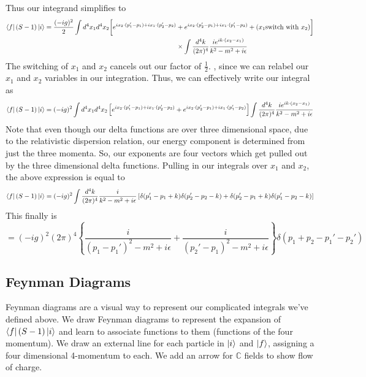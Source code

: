 \documentclass[11pt, oneside]{article}   	%
\theoremstyle{newline}
\theoremstyle{newline}
\theoremstyle{newline}
\theoremstyle{newline}
\theoremstyle{newline}
\begin{document}
Thus our integrand simplifies to
\begin{align*}
\bra { f } ( S- 1 ) \ket { i } = \frac{ ( - i g ) ^ 2 }{ 2 } \int d^ 4 x_1 d^ 4 x_2 \bigg [ e^{ i x_2 \cdot  ( p_1' - p_1 )  + i x_1 \cdot  ( p_2 ' - p_2 ) } & + 
e^{ i x_2 \cdot  ( p_2' - p_1 ) + i x_1 \cdot  ( p_1' - p_2 ) } + ( x_1 \text{switch with } x_2 ) \bigg ] \\
& \times \int \frac{ d^ 4 k }{ ( 2 \pi ) ^ 4 } \frac{ i e^{ ik \cdot  ( x_2 - x_1 ) }}{k ^ 2 - m ^ 2 + i \epsilon } 
\end{align*}
The switching of $ x_1 $ and $ x_2 $ cancels out 
our factor of $ \frac{1}{2 } $. , since we can 
relabel our $ x_1 $ and $ x_2 $ variables in our 
integration. Thus, we can effectively write our integral as 
\[
\bra{ f} ( S - 1) \ket{ i }  = ( - i g ) ^ 2 \int d ^ 4 x_1 d^ 4 x_2 \left[  e^{ i x_2 \cdot  ( p_1 ' - p_1 ) + i x_1 \cdot  ( p_2 ' - p_2 ) } + e^{ i x_2 \cdot  ( p_2 ' - p_1 ) + i x_1 \cdot  ( p_1 ' - p_2 ) } \right] \int \frac{ d^ 4 k }{ ( 2 \pi ) ^ 4 } \frac{ i e ^{ i k \cdot  ( x_2 - x_1 ) } }{ k ^ 2 - m ^ 2 + i \epsilon } 
\] Note that even though our delta functions 
are over three dimensional space, due to 
the relativistic dispersion relation, our energy component
is determined from just the three momenta. So, our exponents are four vectors
which get pulled out by the three dimensional delta functions. 
Pulling in our integrals over $ x_1 $ and $ x_2 $, 
the above expression is equal to 
\[
\bra { f } ( S- 1 ) \ket { i }  = ( - i g ) ^ 2 \int \frac{ d^ 4 k }{ ( 2 \pi ) ^ 4 } \frac{ i }{ k ^ 2 - m ^ 2 + i \epsilon   } \left[  \delta ( p_1 '  - p_1 + k ) \delta ( p_2 ' - p_2 - k )  + \delta ( p_2' - p_1 + k ) \delta ( p_1' - p_2 - k )  \right]  
\] This finally is 
\[
= ( - i g ) ^ 2 ( 2 \pi ) ^ 4 \left\{  \frac{i }{ ( p_1 - p_1' ) ^ 2 - m ^ 2 + i \epsilon } + \frac{ i}{  ( p_2' - p_1) ^ 2 - m^ 2 + i \epsilon } \right\}
\delta ( p_1 + p_2  - p_1 ' - p_2 ' ) 
\] 

\pagebreak
\subsection{Feynman Diagrams} 
Feynman diagrams are a visual way to represent 
our complicated integrals we've defined above. 
We draw Feynman diagrams to 
represent the expansion of $ \bra { f} ( S - 1) \ket{ i } $ and learn to 
associate functions to them (functions of the four momentum). 
We draw an external line for each particle in $ \ket{ i } $
and $ \ket{ f } $, assigning a four dimensional 
4-momentum to each. We add an arrow for  $ \mathbb{C} $  
fields to show flow of charge. 
\end{document}
